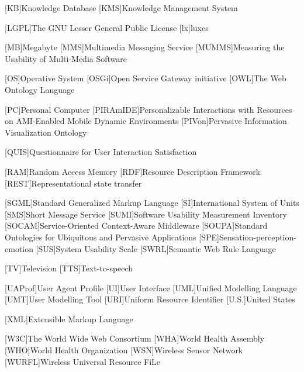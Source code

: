 \begin{acronym}[dynui]
  [KB]{Knowledge Database}
  [KMS]{Knowledge Management System}
  
  [LGPL]{The GNU Lesser General Public License}
  [lx]{luxes}
  
  [MB]{Megabyte}
  [MMS]{Multimedia Messaging Service}
  [MUMMS]{Measuring the Usability of Multi-Media Software}
  
  [OS]{Operative System}
  [OSGi]{Open Service Gateway initiative}
  [OWL]{The Web Ontology Language}
  
  [PC]{Personal Computer}
  [PIRAmIDE]{Personalizable Interactions with Resources on AMI-Enabled Mobile Dynamic Environments}
  [PIVon]{Pervasive Information Visualization Ontology}
  
  [QUIS]{Questionnaire for User Interaction Satisfaction}
  
  [RAM]{Random Access Memory}
  [RDF]{Resource Description Framework}
  [REST]{Representational state transfer}
  
  [SGML]{Standard Generalized Markup Language}
  [SI]{International System of Units}
  [SMS]{Short Message Service}
  [SUMI]{Software Usability Measurement Inventory}
  [SOCAM]{Service-Oriented Context-Aware Middleware}
  [SOUPA]{Standard Ontologies for Ubiquitous and Pervasive Applications}
  [SPE]{Sensation-perception-emotion}
  [SUS]{System Usability Scale}
  [SWRL]{Semantic Web Rule Language}
  
  [TV]{Television}
  [TTS]{Text-to-speech}
  
  [UAProf]{User Agent Profile}
  [UI]{User Interface} %
  [UML]{Unified Modelling Language}
  [UMT]{User Modelling Tool}
  [URI]{Uniform Resource Identifier}
  [U.S.]{United States}
  
  [XML]{Extensible Markup Language}
  
  [W3C]{The World Wide Web Consortium}
  [WHA]{World Health Assembly}
  [WHO]{World Health Organization}
  [WSN]{Wireless Sensor Network}
  [WURFL]{Wireless Universal Resource FiLe}

\end{acronym}
